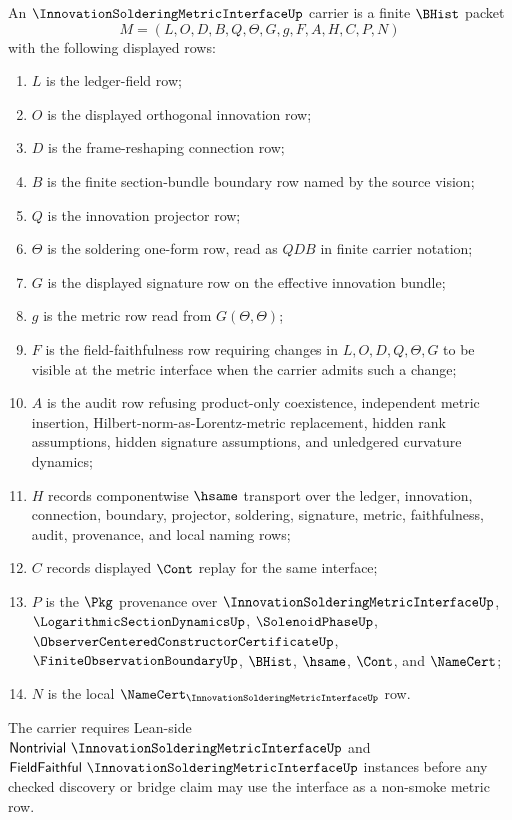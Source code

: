 \begin{definition}
\label{def:innovation-soldering-metric-interface-carrier}
An $\InnovationSolderingMetricInterfaceUp$ carrier is a finite $\BHist$ packet
$$
M=(L,O,D,B,Q,\Theta,G,g,F,A,H,C,P,N)
$$
with the following displayed rows:
\begin{enumerate}
\item $L$ is the ledger-field row;
\item $O$ is the displayed orthogonal innovation row;
\item $D$ is the frame-reshaping connection row;
\item $B$ is the finite section-bundle boundary row named by the source vision;
\item $Q$ is the innovation projector row;
\item $\Theta$ is the soldering one-form row, read as $QDB$ in finite carrier notation;
\item $G$ is the displayed signature row on the effective innovation bundle;
\item $g$ is the metric row read from $G(\Theta,\Theta)$;
\item $F$ is the field-faithfulness row requiring changes in $L,O,D,Q,\Theta,G$ to be visible at the metric interface when the carrier admits such a change;
\item $A$ is the audit row refusing product-only coexistence, independent metric insertion, Hilbert-norm-as-Lorentz-metric replacement, hidden rank assumptions, hidden signature assumptions, and unledgered curvature dynamics;
\item $H$ records componentwise $\hsame$ transport over the ledger, innovation, connection, boundary, projector, soldering, signature, metric, faithfulness, audit, provenance, and local naming rows;
\item $C$ records displayed $\Cont$ replay for the same interface;
\item $P$ is the $\Pkg$ provenance over $\InnovationSolderingMetricInterfaceUp$, $\LogarithmicSectionDynamicsUp$, $\SolenoidPhaseUp$, $\ObserverCenteredConstructorCertificateUp$, $\FiniteObservationBoundaryUp$, $\BHist$, $\hsame$, $\Cont$, and $\NameCert$;
\item $N$ is the local $\NameCert_{\InnovationSolderingMetricInterfaceUp}$ row.
\end{enumerate}
The carrier requires Lean-side $\mathsf{Nontrivial}\ \InnovationSolderingMetricInterfaceUp$ and $\mathsf{FieldFaithful}\ \InnovationSolderingMetricInterfaceUp$ instances before any checked discovery or bridge claim may use the interface as a non-smoke metric row.
\end{definition}

